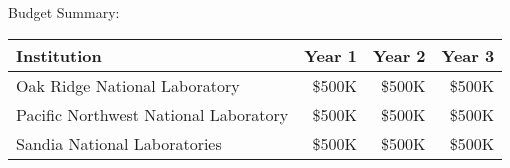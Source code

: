 \begin{titlepage}
\begin{center}
        \vspace{1em}
        Budget Summary: \\
        \vspace{0.5em}
        \begin{tabular}{|l|r|r|r|}                                                                                   
            \hline
            {\bf Institution} & {\bf Year 1} & {\bf Year 2} & {\bf Year 3} \\
            \hline
            Oak Ridge National Laboratory & \$500K & \$500K & \$500K \\ \hline
            Pacific Northwest National Laboratory & \$500K & \$500K & \$500K \\ \hline
            Sandia National Laboratories   & \$500K & \$500K & \$500K \\ \hline
        \end{tabular}
    \end{center}
\end{titlepage}                                                                                                         

